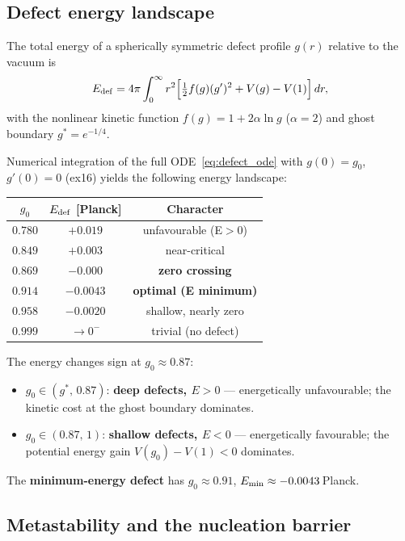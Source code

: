 \subsection{Defect energy landscape}

The total energy of a spherically symmetric defect profile $g(r)$
relative to the vacuum is
\begin{equation}
  E_{\rm def} = 4\pi\int_0^\infty r^2
  \Bigl[\tfrac{1}{2}f(g)(g')^2 + V(g) - V(1)\Bigr]\,dr,
\end{equation}
with the nonlinear kinetic function $f(g)=1+2\alpha\ln g$
($\alpha=2$) and ghost boundary $g^*=e^{-1/4}$.

Numerical integration of the full ODE~\eqref{eq:defect_ode} with
$g(0)=g_0$, $g'(0)=0$ (ex16) yields the following energy landscape:

\begin{center}
\begin{tabular}{ccc}
\hline
$g_0$ & $E_{\rm def}$ [Planck] & Character \\
\hline
$0.780$ & $+0.019$ & unfavourable (E$>$0) \\
$0.849$ & $+0.003$ & near-critical \\
$0.869$ & $-0.000$ & \textbf{zero crossing} \\
$0.914$ & $-0.0043$ & \textbf{optimal (E minimum)} \\
$0.958$ & $-0.0020$ & shallow, nearly zero \\
$0.999$ & $\to 0^-$ & trivial (no defect) \\
\hline
\end{tabular}
\end{center}

\noindent
The energy changes sign at $g_0\approx0.87$:
\begin{itemize}
\item $g_0\in(g^*,\,0.87)$: \textbf{deep defects, $E>0$} — energetically
  unfavourable; the kinetic cost at the ghost boundary dominates.
\item $g_0\in(0.87,\,1)$: \textbf{shallow defects, $E<0$} — energetically
  favourable; the potential energy gain $V(g_0)-V(1)<0$ dominates.
\end{itemize}

The \textbf{minimum-energy defect} has $g_0\approx0.91$,
$E_{\rm min}\approx-0.0043$\,Planck.

\subsection{Metastability and the nucleation barrier}


